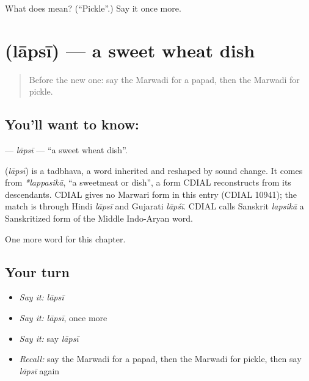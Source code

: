 \begin{tcolorbox}[breakable,colback=teal!4,colframe=teal!35!black,title={Before you move on}]
What does  mean? (\textquotedblleft{}Pickle\textquotedblright{}.) Say it once more.
\end{tcolorbox}
\section[\texorpdfstring{\mw{लापसी} (lāpsī)}{लापसी (lāpsī)}]{ (lāpsī) — a sweet wheat dish}

\label{lesson:MW-C132-lapsi}



\begin{quote}
Before the new one: say the Marwadi for a papad, then the Marwadi for pickle.
\end{quote}

\subsection*{You'll want to know: }
\textbf{} — \emph{lāpsī} — \textquotedblleft{}a sweet wheat dish\textquotedblright{}.

\begin{cousinweb}
\textbf{} (\emph{lāpsī}) is a tadbhava, a word inherited and reshaped by sound change. It comes from \emph{*lappasikā}, \textquotedblleft{}a sweetmeat or dish\textquotedblright{}, a form CDIAL reconstructs from its descendants. CDIAL gives no Marwari form in this entry (CDIAL 10941); the match is through Hindi \emph{lāpsī} and Gujarati \emph{lāpśī}. CDIAL calls Sanskrit \emph{lapsikā} a Sanskritized form of the Middle Indo-Aryan word.
\end{cousinweb}

\begin{grammarlens}[title={What you've built}]
One more word for this chapter.
\end{grammarlens}

\subsection*{Your turn}
\begin{itemize}
\raggedright
  \item \emph{Say it:} \emph{lāpsī}
  \item \emph{Say it:} \emph{lāpsī}, once more
  \item \emph{Say it:} say \emph{lāpsī}
  \item \emph{Recall:} say the Marwadi for a papad, then the Marwadi for pickle, then say \emph{lāpsī} again
\end{itemize}

